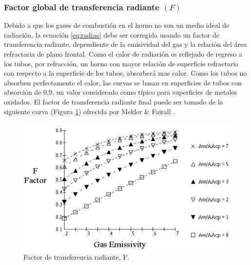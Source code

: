 \subsubsection{Factor global de transferencia radiante $(F)$}
\par Debido a que los gases de combustión en el horno no son un medio ideal de radiación, la ecuación \ref{eq:radiac} debe ser corregida usando un factor de transferencia radiante, dependiente de la emisividad del gas y la relación del área refractaria de plano frontal. Como el calor de radiación es reflejado de regreso a los tubos, por refracción, un horno con mayor relación de superficie refractaria con respecto a la superficie de los tubos, absorberá mas calor. Como los tubos no absorben perfectamente el calor, las curvas se basan en superficies de tubos con absorción de 0,9, un valor considerado como típico para superficies de metales oxidados. El factor de transferencia radiante final puede ser tomado de la siguiente curva (Figura \ref{fig:f}) ofrecida por Mekler \& Fairall \cite{bib:mekler}.
\begin{figure}[H]
\begin{center}
\includegraphics[scale=0.45]{images/f}
\caption[Factor de transferencia radiante, F]{Factor de transferencia radiante, F.\cite{bib:mekler}}
\label{fig:f}
\end{center}
\end{figure}

